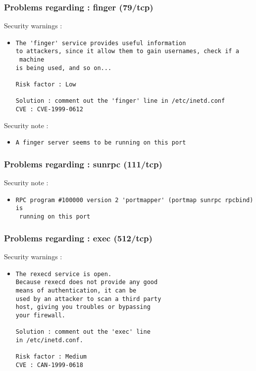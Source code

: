 \documentclass{article}
\begin{document}
\subsubsection{Problems regarding : finger (79/tcp)}
Security warnings :\\
\begin{itemize}
\item \begin{verbatim}
The 'finger' service provides useful information
to attackers, since it allow them to gain usernames, check if a
 machine
is being used, and so on... 

Risk factor : Low

Solution : comment out the 'finger' line in /etc/inetd.conf
CVE : CVE-1999-0612
\end{verbatim}\end{itemize}
Security note :\\
\begin{itemize}
\item \begin{verbatim}
A finger server seems to be running on this port
\end{verbatim}\end{itemize}
\subsubsection{Problems regarding : sunrpc (111/tcp)}
Security note :\\
\begin{itemize}
\item \begin{verbatim}
RPC program #100000 version 2 'portmapper' (portmap sunrpc rpcbind) is
 running on this port
\end{verbatim}\end{itemize}
\subsubsection{Problems regarding : exec (512/tcp)}
Security warnings :\\
\begin{itemize}
\item \begin{verbatim}
The rexecd service is open. 
Because rexecd does not provide any good
means of authentication, it can be
used by an attacker to scan a third party
host, giving you troubles or bypassing
your firewall.

Solution : comment out the 'exec' line 
in /etc/inetd.conf.

Risk factor : Medium
CVE : CAN-1999-0618
\end{verbatim}\end{itemize}
\end{document}
